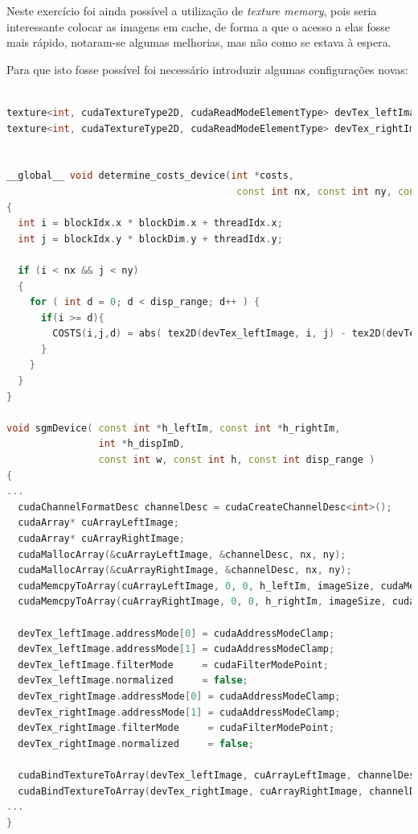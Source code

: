 \documentclass[pdftex,12pt,a4paper]{report}
\begin{document}
Neste exercício foi ainda possível a utilização de \textit{texture memory}, pois seria interessante colocar as imagens em cache, de forma a que o acesso a elas fosse mais rápido, notaram-se algumas melhorias, mas não como se estava à espera.

Para que isto fosse possível foi necessário introduzir algumas configurações novas:

\begin{lstlisting}[language=c++, basicstyle=\scriptsize]

texture<int, cudaTextureType2D, cudaReadModeElementType> devTex_leftImage;
texture<int, cudaTextureType2D, cudaReadModeElementType> devTex_rightImage;


__global__ void determine_costs_device(int *costs,
                                        const int nx, const int ny, const int disp_range)
{
  int i = blockIdx.x * blockDim.x + threadIdx.x;
  int j = blockIdx.y * blockDim.y + threadIdx.y;

  if (i < nx && j < ny)
  {
    for ( int d = 0; d < disp_range; d++ ) {
      if(i >= d){
        COSTS(i,j,d) = abs( tex2D(devTex_leftImage, i, j) - tex2D(devTex_rightImage, i-d, j));
      }
    }
  }
}

void sgmDevice( const int *h_leftIm, const int *h_rightIm,
                int *h_dispImD,
                const int w, const int h, const int disp_range )
{
...
  cudaChannelFormatDesc channelDesc = cudaCreateChannelDesc<int>();
  cudaArray* cuArrayLeftImage;
  cudaArray* cuArrayRightImage;
  cudaMallocArray(&cuArrayLeftImage, &channelDesc, nx, ny);
  cudaMallocArray(&cuArrayRightImage, &channelDesc, nx, ny);
  cudaMemcpyToArray(cuArrayLeftImage, 0, 0, h_leftIm, imageSize, cudaMemcpyHostToDevice);
  cudaMemcpyToArray(cuArrayRightImage, 0, 0, h_rightIm, imageSize, cudaMemcpyHostToDevice);

  devTex_leftImage.addressMode[0] = cudaAddressModeClamp;
  devTex_leftImage.addressMode[1] = cudaAddressModeClamp;
  devTex_leftImage.filterMode     = cudaFilterModePoint;
  devTex_leftImage.normalized     = false;
  devTex_rightImage.addressMode[0] = cudaAddressModeClamp;
  devTex_rightImage.addressMode[1] = cudaAddressModeClamp;
  devTex_rightImage.filterMode     = cudaFilterModePoint;
  devTex_rightImage.normalized     = false;

  cudaBindTextureToArray(devTex_leftImage, cuArrayLeftImage, channelDesc);
  cudaBindTextureToArray(devTex_rightImage, cuArrayRightImage, channelDesc);
...
}
\end{lstlisting} 
\end{document}
